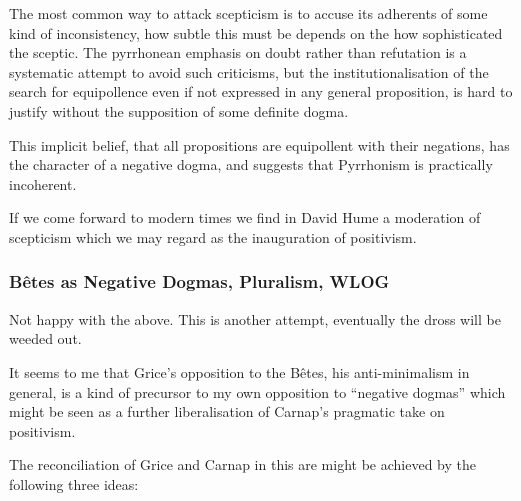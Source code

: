 \documentclass[10pt,titlepage]{book}
\begin{document}
The most common way to attack scepticism is to accuse its adherents of some kind of inconsistency, how subtle this must be depends on the how sophisticated the sceptic.
The pyrrhonean emphasis on doubt rather than refutation is a systematic attempt to avoid such criticisms, but the institutionalisation of the search for equipollence even if not expressed in any general proposition, is hard to justify without the supposition of some definite dogma.

This implicit belief, that all propositions are equipollent with their negations, has the character of a negative dogma, and suggests that Pyrrhonism is practically incoherent.

If we come forward to modern times we find in David Hume a moderation of scepticism which we may regard as the inauguration of positivism.

\subsubsection{B\^etes as Negative Dogmas, Pluralism, WLOG}

Not happy with the above.
This is another attempt, eventually the dross will be weeded out.

It seems to me that Grice's opposition to the B\^etes, his anti-minimalism in general, is a kind of precursor to my own opposition to ``negative dogmas'' which might be seen as a further liberalisation of Carnap's pragmatic take on positivism.

The reconciliation of Grice and Carnap in this are might be achieved by the following three ideas:
\end{document}
